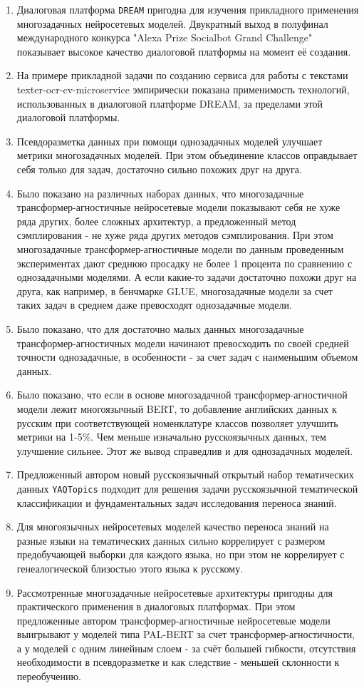 {}
\begin{enumerate}
  \item {Диалоговая платформа \texttt{DREAM} пригодна для изучения прикладного применения многозадачных нейросетевых моделей. Двукратный выход в полуфинал международного конкурса "Alexa Prize Socialbot Grand Challenge" показывает высокое качество диалоговой платформы на момент её создания.}
  \item {На примере прикладной задачи по созданию сервиса для работы с текстами texter-ocr-cv-microservice эмпирически показана применимость технологий, использованных в диалоговой платформе DREAM, за пределами этой диалоговой платформы.}
  \item {Псевдоразметка данных при помощи однозадачных моделей улучшает метрики многозадачных моделей. При этом объединение классов оправдывает себя только для задач, достаточно сильно похожих друг на друга.}
  \item {Было показано на различных наборах данных, что многозадачные трансформер-агностичные нейросетевые модели показывают себя не хуже ряда других, более сложных архитектур, а предложенный метод сэмплирования - не хуже ряда других методов сэмплирования. При этом многозадачные трансформер-агностичные модели по данным проведенным экспериментах дают среднюю просадку не более 1 процента по сравнению с однозадачными моделями. А если какие-то задачи достаточно похожи друг на друга, как например, в бенчмарке GLUE, многозадачные модели за счет таких задач в среднем даже превосходят однозадачные модели.}
  \item {Было показано, что для достаточно малых данных многозадачные трансформер-агностичных модели начинают превосходить по своей средней точности однозадачные, в особенности - за счет задач с наименьшим объемом данных.}
  \item {Было показано, что если в основе многозадачной трансформер-агностичной модели лежит многоязычный BERT, то добавление английских данных к русским при соответствующей номенклатуре классов позволяет улучшить метрики на 1-5\%. Чем меньше изначально русскоязычных данных, тем улучшение сильнее. Этот же вывод справедлив и для однозадачных моделей.}
  \item {Предложенный автором новый русскоязычный открытый набор тематических данных \texttt{YAQTopics} подходит для решения задачи русскоязычной тематической классификации и фундаментальных задач исследования переноса знаний.}
  \item {Для многоязычных нейросетевых моделей качество переноса знаний на разные языки на тематических данных сильно коррелирует с размером предобучающей выборки для каждого языка, но при этом не коррелирует с генеалогической близостью этого языка к русскому.}
  \item {Рассмотренные многозадачные нейросетевые архитектуры пригодны для практического применения в диалоговых платформах. При этом предложенные автором трансформер-агностичные нейросетевые модели выигрывают у моделей типа PAL-BERT за счет трансформер-агностичности, а у моделей с одним линейным слоем - за счёт большей гибкости, отсутствия необходимости в псевдоразметке и как следствие - меньшей склонности к переобучению.}
\end{enumerate}


